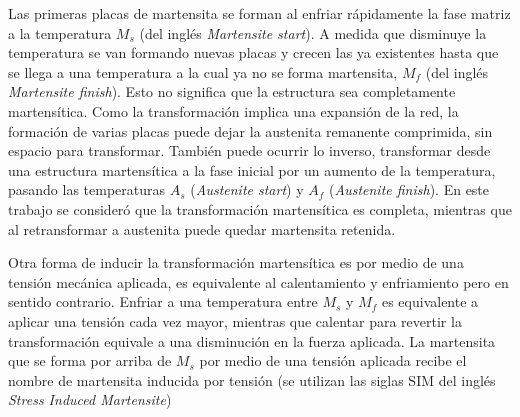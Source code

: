 \documentclass[a4paper,12pt,fleqn,twoside,openany]{book}
\begin{document}

Las primeras placas de martensita se forman al enfriar rápidamente la fase matriz a la temperatura $M_{s}$ (del inglés \textit{Martensite start}). 
A medida que disminuye la temperatura se van formando nuevas placas y crecen las ya existentes hasta que se llega a una temperatura 
a la cual ya no se forma martensita, $M_{f}$ (del inglés \textit{Martensite finish}). Esto no significa que la estructura sea completamente martensítica. 
Como la transformación implica una expansión de la red, la formación de varias placas puede dejar la austenita remanente comprimida, 
sin espacio para transformar. También puede ocurrir lo inverso, transformar desde una estructura martensítica a la fase inicial 
por un aumento de la temperatura, pasando las temperaturas $A_{s}$ (\textit{Austenite start}) y $A_{f}$ (\textit{Austenite finish}). En este trabajo se consideró que la transformación martensítica es completa, mientras que al retransformar a austenita puede quedar martensita retenida.

  

Otra forma de inducir la transformación martensítica es por medio de una tensión mecánica aplicada, es equivalente al calentamiento y enfriamiento pero en 
sentido contrario. Enfriar a una temperatura entre $M_{s}$ y $M_{f}$ es equivalente a aplicar una tensión cada vez mayor, mientras que calentar para revertir la 
transformación equivale a una disminución en la fuerza aplicada. La martensita que se forma por arriba de $M_{s}$ por medio de una 
tensión aplicada recibe el nombre de martensita inducida por tensión (se utilizan las siglas SIM del inglés \textit{Stress Induced Martensite})

  
\end{document}
